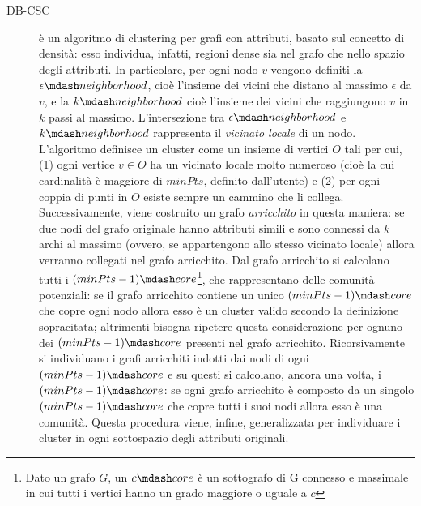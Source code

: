 \begin{description}
\item [DB-CSC] \`e un algoritmo di clustering per grafi con attributi, basato sul concetto di densit\`a: esso individua, infatti, regioni dense sia nel grafo che nello spazio degli attributi. In particolare, per ogni nodo $ v $ vengono definiti la $ \epsilon \mdash neighborhood $, cio\`e l'insieme dei vicini che distano al massimo $ \epsilon $ da $ v $, e la $ k \mdash neighborhood $ cio\`e l'insieme dei vicini che raggiungono $ v $ in  $ k $ passi al massimo. L'intersezione tra $ \epsilon \mdash neighborhood $ e $ k \mdash neighborhood $ rappresenta il \textit{vicinato locale} di un nodo. L'algoritmo definisce un cluster come un insieme di vertici $ O $ tali per cui, (1) ogni vertice $ v \in O $ ha un vicinato locale molto numeroso (cio\`e la cui cardinalit\`a \`e maggiore di $ minPts $, definito dall'utente) e (2) per ogni coppia di punti in $ O $ esiste sempre un cammino che li collega.
Successivamente, viene costruito un grafo \textit{arricchito} in questa maniera: se due nodi del grafo originale hanno attributi simili e sono connessi da $ k $ archi al massimo (ovvero, se appartengono allo stesso vicinato locale) allora verranno collegati nel grafo arricchito. Dal grafo arricchito si calcolano tutti i $ (minPts-1) \mdash core$\footnote{Dato un grafo $ G $, un $ c \mdash core $  \`e un sottografo di G connesso e massimale in cui tutti i vertici hanno un grado maggiore o uguale a $ c $}, che rappresentano delle comunit\`a potenziali: se il grafo arricchito contiene un unico $ (minPts-1) \mdash core $ che copre ogni nodo allora esso \`e un cluster valido secondo la definizione sopracitata; altrimenti bisogna ripetere questa considerazione per ognuno dei $ (minPts-1) \mdash core $ presenti nel grafo arricchito. Ricorsivamente si individuano i grafi arricchiti indotti dai nodi di ogni $ (minPts-1) \mdash core $ e su questi si calcolano, ancora una volta, i $ (minPts-1) \mdash core $: se ogni grafo arricchito \`e composto da un singolo $ (minPts-1) \mdash core $ che copre tutti i suoi nodi allora esso \`e una comunit\`a.
Questa procedura viene, infine, generalizzata per individuare i cluster in ogni sottospazio degli attributi originali.


\end{description}
